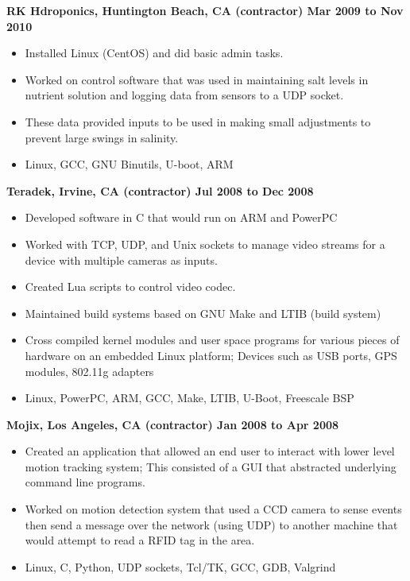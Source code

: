 \documentclass{res}
\begin{document}
\begin{resume}
{\large \bf RK Hdroponics, Huntington Beach, CA (contractor) \hfill Mar 2009 to Nov 2010}
\begin{itemize}
\item Installed Linux (CentOS) and did basic admin tasks.
\item Worked on control software that was used in maintaining salt
levels in nutrient solution and logging data from sensors to a UDP socket.
\item These data provided inputs to be used in making small adjustments
to prevent large swings in salinity.
\item Linux, GCC, GNU Binutils, U-boot, ARM
\end{itemize}

{\large \bf Teradek, Irvine, CA (contractor) \hfill Jul 2008 to Dec 2008}
\begin{itemize}
\item Developed software in C that would run on ARM and PowerPC
\item Worked with TCP, UDP, and Unix sockets to manage video streams for
a device with multiple cameras as inputs.
\item Created Lua scripts to control video codec.
\item Maintained build systems based on GNU Make and LTIB (build system)
\item Cross compiled kernel modules and user space programs for various
pieces of hardware on an embedded Linux platform; Devices such as USB
ports, GPS modules, 802.11g adapters
\item  Linux, PowerPC, ARM, GCC, Make, LTIB, U-Boot, Freescale BSP
\end{itemize}

{\large \bf Mojix, Los Angeles, CA (contractor) \hfill Jan 2008 to Apr 2008}
\begin{itemize}

\item Created an application that allowed an end user to interact
with lower level motion tracking system; This consisted of a GUI
that abstracted underlying command line programs.

\item Worked on motion detection system that used a CCD camera to sense
events then send a message over the network (using UDP) to another
machine that would attempt to read a RFID tag in the area.

\item Linux, C, Python, UDP sockets, Tcl/TK, GCC, GDB, Valgrind
\end{itemize}


\end{resume}
\end{document}
